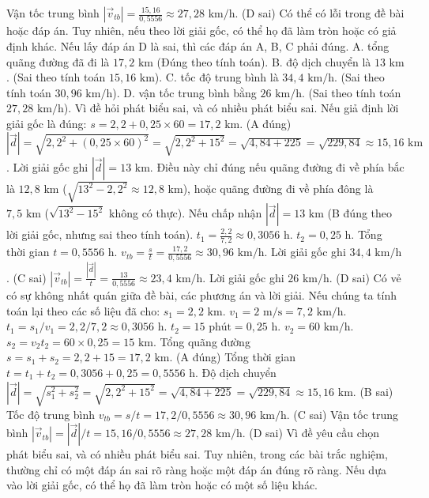 \begin{ex}
{Vận tốc trung bình $|\vec{v}_{tb}| = \frac{15,16}{0,5556} \approx 27,28 \text{ km/h}$. (D sai)
Có thể có lỗi trong đề bài hoặc đáp án. Tuy nhiên, nếu theo lời giải gốc, có thể họ đã làm tròn hoặc có giả định khác.
Nếu lấy đáp án D là sai, thì các đáp án A, B, C phải đúng.
A. tổng quãng đường đã đi là $17,2 \text{ km}$ (Đúng theo tính toán).
B. độ dịch chuyển là $13 \text{ km}$. (Sai theo tính toán $15,16 \text{ km}$).
C. tốc độ trung bình là $34,4 \text{ km/h}$. (Sai theo tính toán $30,96 \text{ km/h}$).
D. vận tốc trung bình bằng $26 \text{ km/h}$. (Sai theo tính toán $27,28 \text{ km/h}$).
Vì đề hỏi phát biểu sai, và có nhiều phát biểu sai.
Nếu giả định lời giải gốc là đúng:
$s = 2,2 + 0,25 \times 60 = 17,2 \text{ km}$. (A đúng)
$|\vec{d}| = \sqrt{2,2^2 + (0,25 \times 60)^2} = \sqrt{2,2^2 + 15^2} = \sqrt{4,84 + 225} = \sqrt{229,84} \approx 15,16 \text{ km}$.
Lời giải gốc ghi $|\vec{d}| = 13 \text{ km}$. Điều này chỉ đúng nếu quãng đường đi về phía bắc là $12,8 \text{ km}$ ($ \sqrt{13^2 - 2,2^2} \approx 12,8 \text{ km}$), hoặc quãng đường đi về phía đông là $7,5 \text{ km}$ ($ \sqrt{13^2 - 15^2}$ không có thực).
Nếu chấp nhận $|\vec{d}| = 13 \text{ km}$ (B đúng theo lời giải gốc, nhưng sai theo tính toán).
$t_1 = \frac{2,2}{7,2} \approx 0,3056 \text{ h}$. $t_2 = 0,25 \text{ h}$. Tổng thời gian $t = 0,5556 \text{ h}$.
$v_{tb} = \frac{s}{t} = \frac{17,2}{0,5556} \approx 30,96 \text{ km/h}$. Lời giải gốc ghi $34,4 \text{ km/h}$. (C sai)
$|\vec{v}_{tb}| = \frac{|\vec{d}|}{t} = \frac{13}{0,5556} \approx 23,4 \text{ km/h}$. Lời giải gốc ghi $26 \text{ km/h}$. (D sai)
Có vẻ có sự không nhất quán giữa đề bài, các phương án và lời giải.
Nếu chúng ta tính toán lại theo các số liệu đã cho:
$s_1 = 2,2 \text{ km}$. $v_1 = 2 \text{ m/s} = 7,2 \text{ km/h}$. $t_1 = s_1/v_1 = 2,2/7,2 \approx 0,3056 \text{ h}$.
$t_2 = 15 \text{ phút} = 0,25 \text{ h}$. $v_2 = 60 \text{ km/h}$. $s_2 = v_2 t_2 = 60 \times 0,25 = 15 \text{ km}$.
Tổng quãng đường $s = s_1 + s_2 = 2,2 + 15 = 17,2 \text{ km}$. (A đúng)
Tổng thời gian $t = t_1 + t_2 = 0,3056 + 0,25 = 0,5556 \text{ h}$.
Độ dịch chuyển $|\vec{d}| = \sqrt{s_1^2 + s_2^2} = \sqrt{2,2^2 + 15^2} = \sqrt{4,84 + 225} = \sqrt{229,84} \approx 15,16 \text{ km}$. (B sai)
Tốc độ trung bình $v_{tb} = s/t = 17,2 / 0,5556 \approx 30,96 \text{ km/h}$. (C sai)
Vận tốc trung bình $|\vec{v}_{tb}| = |\vec{d}|/t = 15,16 / 0,5556 \approx 27,28 \text{ km/h}$. (D sai)
Vì đề yêu cầu chọn phát biểu sai, và có nhiều phát biểu sai. Tuy nhiên, trong các bài trắc nghiệm, thường chỉ có một đáp án sai rõ ràng hoặc một đáp án đúng rõ ràng.
Nếu dựa vào lời giải gốc, có thể họ đã làm tròn hoặc có một số liệu khác.
}
\end{ex}
